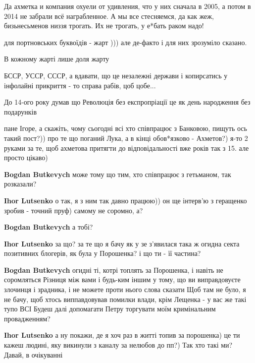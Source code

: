 \begin{itemize}
Да ахметка и компания охуели от удивления, что у них сначала в 2005, а потом в
2014 не забрали всё награбленное. А мы все стесняемся, да как жеж,
бизьнесьменов низзя трогать. Их не трогать, у е*бать раком надо!


для портновських буквоїдів - жарт ))) але де-факто і для них зрозуміло сказано.

В кожному жарті лише доля жарту

БССР, УССР, СССР, а вдавати, що це незалежні держави і копирсатись у інфолайні прикриття - то справа рабів, цоб цобе...

До 14-ого року думав що Революція без експропріації це як день народження без подарунків


пане Ігоре, а скажіть, чому сьогодні всі хто співпрацює з Банковою, пищуть ось
такий пост?)) про те що поганий Лука, а в кінці обов*язково - Ахметов?) я-то 2
руками за те, щоб ахметова притягти до відповідальності вже років так з 15. але
просто цікаво)

\begin{itemize} %
\textbf{Bogdan Butkevych} може тому що тим, хто співпрацює з гетьманом, так розказали?


\textbf{Ihor Lutsenko} о так, я з ним так давно працюю)) он ще інтерв'ю з геращенко зробив - точний пруф) самому не соромно, а?

\textbf{Bogdan Butkevych} а тобі?


\textbf{Ihor Lutsenko} за що? за те що я бачу як у зе з'явилася така ж огидна секта позитивних блогерів, як була у Порошенка? і що ти - її частина?

\textbf{Bogdan Butkevych} огидні ті, котрі топлять за Порошенка, і навіть не соромляться
Різниця між вами і будь-ким іншим у тому, що ви виправдовуєте злочинця і зрадника, і не можете проти нього слова сказати
Щоб там не було, я не бачу, щоб хтось виппавдовував помилки влади, крім Лещенка - у вас же такі тупо ВСІ
Будеш далі допомагати Петру торгувати моїм кримінальним провадженням?

\textbf{Ihor Lutsenko} а ну покажи, де я хоч раз в житті топив за порошенка) це ти кажеш людині, яку викинули з каналу за нелюбов до пп?) Так хто такі ми? Давай, в очікуванні


\end{itemize}
\end{itemize}
